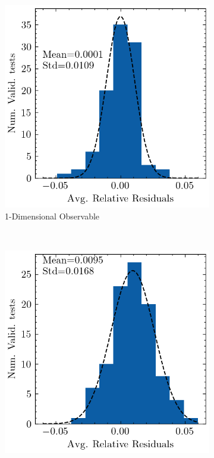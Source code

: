 \documentclass[a4paper,11pt]{article}
\begin{document}
\begin{figure}[H]
    \centering
    \begin{subfigure}[b]{0.4\textwidth}
        \centering
        \includegraphics[width=\textwidth]{./plots/residuals_hist_1D.png}
        \caption{1-Dimensional Observable}
    \end{subfigure}
    ~
    \begin{subfigure}[b]{0.4\textwidth}
        \centering
        \includegraphics[width=\textwidth]{./plots/residuals_hist_2D.png}

\end{subfigure}
\end{figure}
\end{document}
